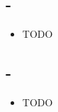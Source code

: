 \documentclass[a4paper,10pt,titlepage]{article}
\begin{document}
\subsection*{-}

\begin{itemize}
\item
TODO
\end{itemize}

\subsection*{-}

\begin{itemize}
\item
TODO
\end{itemize}
\end{document}
